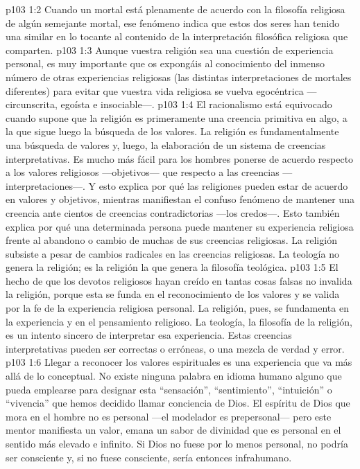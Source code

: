 \vs p103 1:2 Cuando un mortal está plenamente de acuerdo con la filosofía religiosa de algún semejante mortal, ese fenómeno indica que estos dos seres han tenido una  similar en lo tocante al contenido de la interpretación filosófica religiosa que comparten.
\vs p103 1:3 Aunque vuestra religión sea una cuestión de experiencia personal, es muy importante que os expongáis al conocimiento del inmenso número de otras experiencias religiosas (las distintas interpretaciones de mortales diferentes) para evitar que vuestra vida religiosa se vuelva egocéntrica ---circunscrita, egoísta e insociable---.
\vs p103 1:4 El racionalismo está equivocado cuando supone que la religión es primeramente una creencia primitiva en algo, a la que sigue luego la búsqueda de los valores. La religión es fundamentalmente una búsqueda de valores y, luego, la elaboración de un sistema de creencias interpretativas. Es mucho más fácil para los hombres ponerse de acuerdo respecto a los valores religiosos ---objetivos--- que respecto a las creencias ---interpretaciones---. Y esto explica por qué las religiones pueden estar de acuerdo en valores y objetivos, mientras manifiestan el confuso fenómeno de mantener una creencia ante cientos de creencias contradictorias ---los credos---. Esto también explica por qué una determinada persona puede mantener su experiencia religiosa frente al abandono o cambio de muchas de sus creencias religiosas. La religión subsiste a pesar de cambios radicales en las creencias religiosas. La teología no genera la religión; es la religión la que genera la filosofía teológica.
\vs p103 1:5 El hecho de que los devotos religiosos hayan creído en tantas cosas falsas no invalida la religión, porque esta se funda en el reconocimiento de los valores y se valida por la fe de la experiencia religiosa personal. La religión, pues, se fundamenta en la experiencia y en el pensamiento religioso. La teología, la filosofía de la religión, es un intento sincero de interpretar esa experiencia. Estas creencias interpretativas pueden ser correctas o erróneas, o una mezcla de verdad y error.
\vs p103 1:6 Llegar a reconocer los valores espirituales es una experiencia que va más allá de lo conceptual. No existe ninguna palabra en idioma humano alguno que pueda emplearse para designar esta “sensación”, “sentimiento”, “intuición” o “vivencia” que hemos decidido llamar conciencia de Dios. El espíritu de Dios que mora en el hombre no es personal ---el modelador es prepersonal--- pero este mentor manifiesta un valor, emana un sabor de divinidad que es personal en el sentido más elevado e infinito. Si Dios no fuese por lo menos personal, no podría ser consciente y, si no fuese consciente, sería entonces infrahumano.
